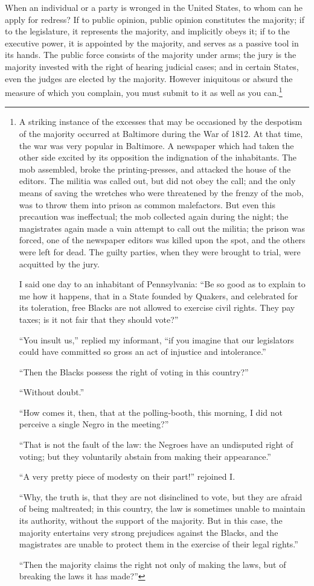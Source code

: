 When an individual or a party is wronged in the United States, to whom
can he apply for redress? If to public opinion, public opinion
constitutes the majority; if to the legislature, it represents the
majority, and implicitly obeys it; if to the executive power, it is
appointed by the majority, and serves as a passive tool in its hands.
The public force consists of the majority under arms; the jury is the
majority invested with the right of hearing judicial cases; and in
certain States, even the judges are elected by the majority. However
iniquitous or absurd the measure of which you complain, you must
submit to it as well as you can.\footnote{A striking instance of the
excesses that may be occasioned by the despotism of the majority
occurred at Baltimore during the War of 1812. At that time, the war
was very popular in Baltimore. A newspaper which had taken the other
side excited by its opposition the indignation of the inhabitants. The
mob assembled, broke the printing-presses, and attacked the house of
the editors. The militia was called out, but did not obey the call;
and the only means of saving the wretches who were threatened by the
frenzy of the mob, was to throw them into prison as common
malefactors. But even this precaution was ineffectual; the mob
collected again during the night; the magistrates again made a vain
attempt to call out the militia; the prison was forced, one of the
newspaper editors was killed upon the spot, and the others were left
for dead. The guilty parties, when they were brought to trial, were
acquitted by the jury.

I said one day to an inhabitant of Pennsylvania: ``Be so good as to
explain to me how it happens, that in a State founded by Quakers, and
celebrated for its toleration, free Blacks are not allowed to exercise
civil rights. They pay taxes; is it not fair that they should
vote?''

``You insult us,'' replied my informant, ``if you imagine that our
legislators could have committed so gross an act of injustice and
intolerance.''

``Then the Blacks possess the right of voting in this country?''

``Without doubt.''

``How comes it, then, that at the polling-booth, this morning, I did
not perceive a single Negro in the meeting?''

``That is not the fault of the law: the Negroes have an undisputed
right of voting; but they voluntarily abstain from making their
appearance.''

``A very pretty piece of modesty on their part!'' rejoined I.

``Why, the truth is, that they are not disinclined to vote, but they
are afraid of being maltreated; in this country, the law is sometimes
unable to maintain its authority, without the support of the majority.
But in this case, the majority entertains very strong prejudices
against the Blacks, and the magistrates are unable to protect them in
the exercise of their legal rights.''

``Then the majority claims the right not only of making the laws, but
of breaking the laws it has made?''}

